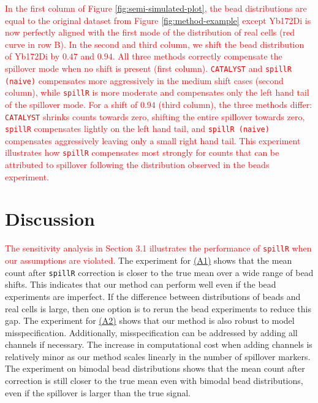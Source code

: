\documentclass[
]{article}
\begin{document}
\textcolor{red}{
In the first column of Figure \ref{fig:semi-simulated-plot}, the bead distributions are equal to the original dataset from Figure \ref{fig:method-example} except Yb172Di is now perfectly aligned with the first mode of the distribution of real cells (red curve in row B). In the second and third column, we shift the bead distribution of Yb172Di by $0.47$ and $0.94$. All three methods correctly compensate the spillover mode when no shift is present (first column). \texttt{CATALYST} and \texttt{spillR (naive)} compensates more aggressively in the medium shift cases (second column), while \texttt{spillR} is more moderate and compensates only the left hand tail of the spillover mode. For a shift of $0.94$ (third column), the three methods differ: \texttt{CATALYST} shrinks counts towards zero, shifting the entire spillover towards zero, \texttt{spillR} compensates lightly on the left hand tail, and \texttt{spillR (naive)} compensates aggressively leaving only a small right hand tail. This experiment illustrates how \texttt{spillR} compensates most strongly for counts that can be attributed to spillover following the distribution observed in the beads experiment.
}

\section{Discussion}\label{discussion}

\textcolor{red}{The sensitivity analysis in Section 3.1 illustrates the performance of \texttt{spillR} when our assumptions are violated.}
The experiment for \hyperref[assumption1]{(A1)} shows that the mean count after \texttt{spillR} correction is closer to the true mean over a wide range of bead shifts. This indicates that our method can perform well even if the bead experiments are imperfect. If the difference between distributions of beads and real cells is large, then one option is to rerun the bead experiments to reduce this gap. The experiment for \hyperref[assumption2]{(A2)} shows that our method is also robust to model misspecification. Additionally, misspecification can be addressed by adding all channels if necessary. The increase in computational cost when adding channels is relatively minor as our method scales linearly in the number of spillover markers. The experiment on bimodal bead distributions shows that the mean count after correction is still closer to the true mean even with bimodal bead distributions, even if the spillover is larger than the true signal.
\end{document}
